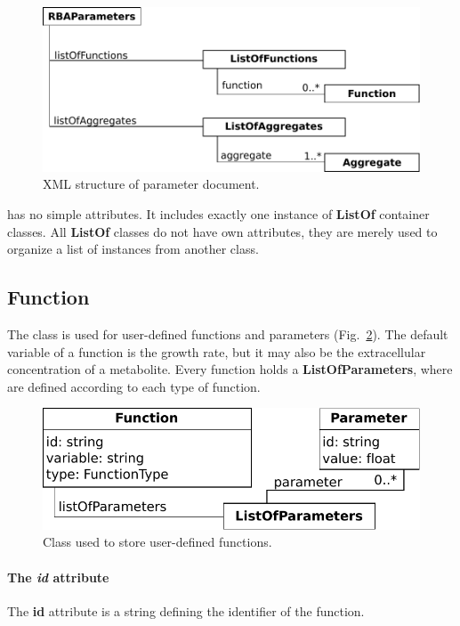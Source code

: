 \begin{figure}
  \centering
  \includegraphics[scale=0.8]{figures/parameters_doc}
  \caption{XML structure of parameter document.}
\label{fig:parameters_doc}
\end{figure}

\rbaparameters{} has no simple attributes.
It includes exactly one instance of \textbf{ListOf} container classes.
All \textbf{ListOf} classes do not have own attributes,
they are merely used to organize a list of instances from another class.

\subsection{Function}
\label{sec:function}

The \function{} class is used for user-defined functions and parameters
(Fig.~\ref{fig:parameters_function}).
The default variable of a function is the growth rate, but it may also be
the extracellular concentration of a metabolite.
Every function holds a \textbf{ListOfParameters},
where \parameter{} are defined according to each type of function.

\begin{figure}
  \centering
  \includegraphics[scale=0.8]{figures/parameters_function}
  \caption{Class used to store user-defined functions.}
\label{fig:parameters_function}
\end{figure}

\paragraph{The \textit{id} attribute}
The \textbf{id} attribute is a string defining the identifier of the function.

